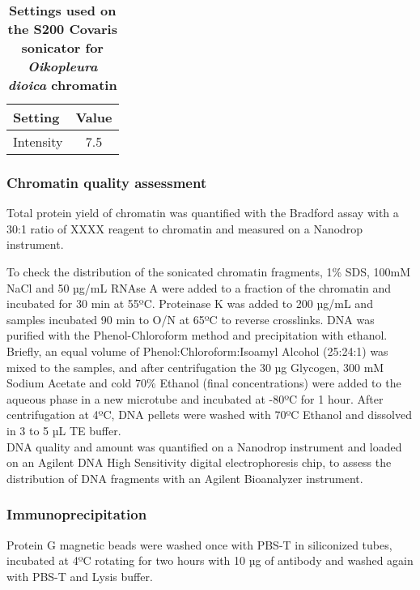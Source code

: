 \documentclass[11pt,twoside,a4paper]{report}
\begin{document}
			\begin{table}[!ht]
        		\caption{
	            \bf{Settings used on the S200 Covaris sonicator for \textit{Oikopleura dioica} chromatin}
    		    }
        		\begin{center}
        		\begin{tabular}{|l|c|}
            		\hline
	            Setting & Value\\
        		    \hline
            	    Intensity & 7.5\\
	        		\hline
	        \end{tabular}
    		    \end{center}
	        \label{table:CovarisSettings}
		    \end{table}
			
			\subsubsection{Chromatin quality assessment}
			\label{section:chromQualityAssess}
			Total protein yield of chromatin was quantified with the Bradford assay with a 30:1 ratio of XXXX reagent to chromatin and measured on a Nanodrop instrument.
			
			To check the distribution of the sonicated chromatin fragments, 1\% SDS, 100mM NaCl and 50 µg/mL RNAse A were added to a fraction of the chromatin and incubated for 30 min at 55ºC. Proteinase K was added to 200 µg/mL and samples incubated 90 min to O/N at 65ºC to reverse crosslinks. DNA was purified with the Phenol-Chloroform method and precipitation with ethanol. Briefly, an equal volume of Phenol:Chloroform:Isoamyl Alcohol (25:24:1) was mixed to the samples, and after centrifugation the 30 µg Glycogen, 300 mM Sodium Acetate and cold 70\% Ethanol (final concentrations) were added to the aqueous phase in a new microtube and incubated at -80ºC for 1 hour. After centrifugation at 4ºC, DNA pellets were washed with 70ºC Ethanol and dissolved in 3 to 5 µL TE buffer. \\
			
			DNA quality and amount was quantified on a Nanodrop instrument and loaded on an Agilent DNA High Sensitivity digital electrophoresis chip, to assess the distribution of DNA fragments with an Agilent Bioanalyzer instrument.
			
			\subsubsection{Immunoprecipitation}
			Protein G magnetic beads were washed once with PBS-T in siliconized tubes, incubated at 4ºC rotating for two hours with 10 µg of antibody and washed again with PBS-T and Lysis buffer. \\
			
\end{document}
